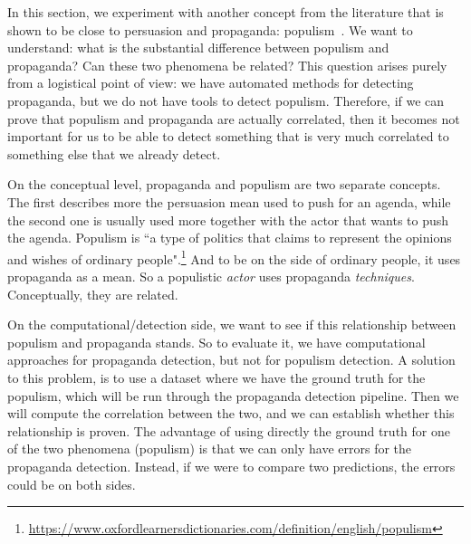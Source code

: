 In this section, we experiment with another concept from the literature that is shown to be close to persuasion and propaganda: \gls{populism}~\citep{tumber2021routledge,pasquino2008populism}.
We want to understand: what is the substantial difference between populism and propaganda? Can these two phenomena be related?
This question arises purely from a logistical point of view: we have automated methods for detecting propaganda, but we do not have tools to detect populism. Therefore, if we can prove that populism and propaganda are actually correlated, then it becomes not important for us to be able to detect something that is very much correlated to something else that we already detect.

On the conceptual level, propaganda and populism are two separate concepts. The first describes more the persuasion mean used to push for an agenda, while the second one is usually used more together with the actor that wants to push the agenda. Populism is ``a type of politics that claims to represent the opinions and wishes of ordinary people".\footnote{\url{https://www.oxfordlearnersdictionaries.com/definition/english/populism}}
And to be on the side of ordinary people, it uses propaganda as a mean. So a populistic \emph{actor} uses propaganda \emph{techniques}. Conceptually, they are related.



On the computational/detection side, we want to see if this relationship between populism and propaganda stands.
So to evaluate it, we have computational approaches for propaganda detection, but not for populism detection.
A solution to this problem, is to use a dataset where we have the ground truth for the populism, which will be run through the propaganda detection pipeline. Then we will compute the correlation between the two, and we can establish whether this relationship is proven. The advantage of using directly the ground truth for one of the two phenomena (populism) is that we can only have errors for the propaganda detection. Instead, if we were to compare two predictions, the errors could be on both sides.

